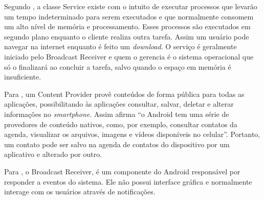 	\par Segundo , a classe Service existe com o intuito
de executar processos que levarão um tempo indeterminado para serem executados
e que normalmente consomem um alto nível de memória e processamento. Esses
processos são executados em segundo plano enquanto o cliente realiza outra
tarefa. Assim um usuário pode navegar na internet enquanto é feito um
\textit{download}. O serviço é geralmente iniciado pelo Broadcast Receiver e
quem o gerencia é o sistema operacional que só o finalizará ao concluir a
tarefa, salvo quando o espaço em memória é insuficiente.

	\par Para , um Content Provider provê conteúdos de
forma pública para todas as aplicações, possibilitando às aplicações consultar,
salvar, deletar e alterar informações no \textit{smartphone}. Assim afirma
 “o Android tem uma série de provedores de
conteúdo nativos, como, por exemplo, consultar contatos da agenda, visualizar
os arquivos, imagens e vídeos disponíveis no celular”. Portanto, um contato
pode ser salvo na agenda de contatos do dispositivo por um aplicativo e
alterado por outro.

	\par Para , o Broadcast Receiver,
é um componente do Android responsável por responder a eventos do sistema.
Ele não possui interface gráfica e normalmente interage com os usuários através
de notificações.
